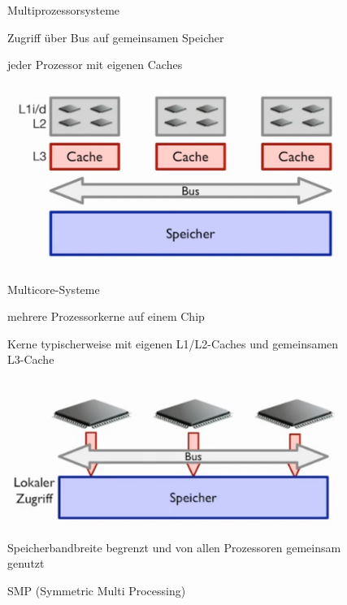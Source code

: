 \documentclass[10pt]{article}
\begin{document}
\begin{figure}[!tbp]
\begin{minipage}[b]{0.45\textwidth}
      \caption{Multiprozessorsysteme}
      \begin{itemize*}
        \item Zugriff über Bus auf gemeinsamen Speicher
        \item jeder Prozessor mit eigenen Caches
      \end{itemize*}
    \end{minipage}
    \hfill
    \begin{minipage}[b]{0.45\textwidth}
      \includegraphics[width=1.0\linewidth]{Assets/Programmierparadigmen-Multicore-Systeme}
      \caption{Multicore-Systeme}
      \begin{itemize*}
        \item mehrere Prozessorkerne auf einem Chip
        \item Kerne typischerweise mit eigenen L1/L2-Caches und gemeinsamen L3-Cache
      \end{itemize*}
    \end{minipage}
    \vfill
    \begin{minipage}[b]{0.45\textwidth}
      \includegraphics[width=1.0\linewidth]{Assets/Programmierparadigmen-SMP}
      \caption{SMP (Symmetric Multi Processing)}
      \begin{itemize*}
        \item Speicherbandbreite begrenzt und von allen Prozessoren gemeinsam genutzt

\end{itemize*}
\end{minipage}
\end{figure}
\end{document}
